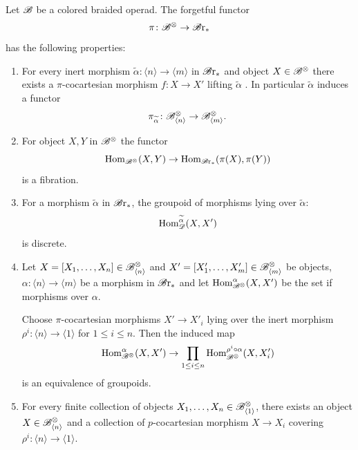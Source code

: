 \begin{prop}\label{prop:Bx-fib-properties} Let $\mathscr{B}$ be a colored braided operad.
    The forgetful functor
    \[
        \pi \colon \mathscr{B}^{\otimes} \to \mathscr{B} \text{r}_{\ast}
    \]
    has the following properties:
    \begin{enumerate}
        \item For every inert morphism $\widetilde{\alpha} \colon \langle n
        \rangle \to \langle m \rangle$  in $\mathscr{B} \text{r}_{\ast}$ and object $X \in \mathscr{B}^{\otimes}$ there
        exists a $\pi$-cocartesian morphism $f \colon X \to X'$ lifting
        $\widetilde{\alpha}$ . In particular $\widetilde{\alpha}$ induces a
        functor 
        $$\pi_{\widetilde{\alpha}} \colon \mathscr{B}^{\otimes}_{\langle n \rangle} \to
        \mathscr{B}^{\otimes}_{\langle m \rangle}.$$
        \item For object $X,Y$ in $\mathscr{B}^{\otimes}$ the functor
        \[
                \operatorname{Hom}_{\mathscr{B}^{\otimes}}(X,Y) \to \operatorname{Hom}_{\mathscr{B} \text{r}_{\ast}}(\pi(X),\pi(Y))
        \]
        is a fibration.
        \item For a morphism $\widetilde{\alpha}$ in $\mathscr{B} \text{r}_{\ast}$, the groupoid of
        morphisms lying over $\widetilde{\alpha}$:
        $$\operatorname{Hom}_{\mathscr{D}}^{\widetilde{\alpha}}(X, X')$$ is discrete. 
        \item Let $X = [X_1, \dots, X_n] \in \mathscr{B}^{\otimes}_{\langle n \rangle}$ and $X' =
        [X_1', \dots, X_m'] \in \mathscr{B}^{\otimes}_{\langle m \rangle}$ be objects, $\alpha :
        \langle n \rangle \to \langle m \rangle$ be a morphism in $\mathscr{B} \text{r}_{\ast}$ and let
        $\operatorname{Hom}_{\mathscr{B}^{\otimes}}^{\alpha}(X, X')$ be the set if morphisms over $\alpha$. 
        
        Choose $\pi$-cocartesian morphisms $X' \to X'_i$ lying over the inert
        morphism $\rho^i \colon \langle n \rangle \to \langle 1 \rangle$ for $1
        \leq i \leq n$. Then the induced map
        \[
            \operatorname{Hom}_{\mathscr{B}^{\otimes}}^{\alpha}(X, X') \to \prod_{1 \leq i \leq n} \operatorname{Hom}_{\mathscr{B}^{\otimes}}^{\rho^i \circ \alpha}(X, X_i')
        \]
        is an equivalence of groupoids. 
        
        \item For every finite collection of objects $X_1, \dots, X_n \in
        \mathscr{B}^{\otimes}_{\langle 1 \rangle}$, there exists an object $X \in \mathscr{B}^{\otimes}_{\langle n
        \rangle}$ and a collection of $p$-cocartesian morphism $X \to X_i$
        covering $\rho^i \colon \langle n \rangle \to \langle 1 \rangle$.
    \end{enumerate}
\end{prop}
